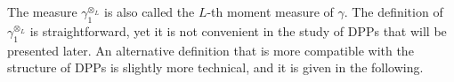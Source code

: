 \documentclass[twoside,11pt]{book}
\numberwithin{theorem}{chapter}
\numberwithin{definition}{chapter}
\numberwithin{proposition}{chapter}
\numberwithin{corollary}{chapter}
\numberwithin{example}{chapter}
\numberwithin{lemma}{chapter}
\numberwithin{assumption}{chapter}
\DeclareMathOperator{\EX}{\mathbb{E}}
\begin{document}


The measure $\gamma_{1}^{\otimes_{L}}$ is also called the $L$-th moment measure of $\gamma$. The definition of $\gamma^{\otimes_{L}}_{1}$ is straightforward, yet it is not convenient in the study of DPPs that will be presented later.  
An alternative definition that is more compatible with the structure of DPPs is slightly more technical, and it is given in the following. 
\end{document}

